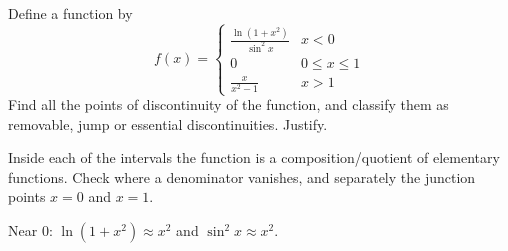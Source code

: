 
\begin{question}
Define a function by
\[ f(x)=\begin{cases}\frac{\ln(1+x^2)}{\sin^2 x} & x<0\\ 0 & 0\le x\le 1\\ \frac{x}{x^2-1} & x>1\end{cases} \]
Find all the points of discontinuity of the function, and classify them as removable, jump or essential discontinuities. Justify.
\end{question}

\begin{hint}
Inside each of the intervals the function is a composition/quotient of elementary functions. Check where a denominator vanishes, and separately the junction points $x=0$ and $x=1$.
\end{hint}

\begin{hint}
Near $0$: $\ln(1+x^2)\approx x^2$ and $\sin^2x\approx x^2$.
\end{hint}


